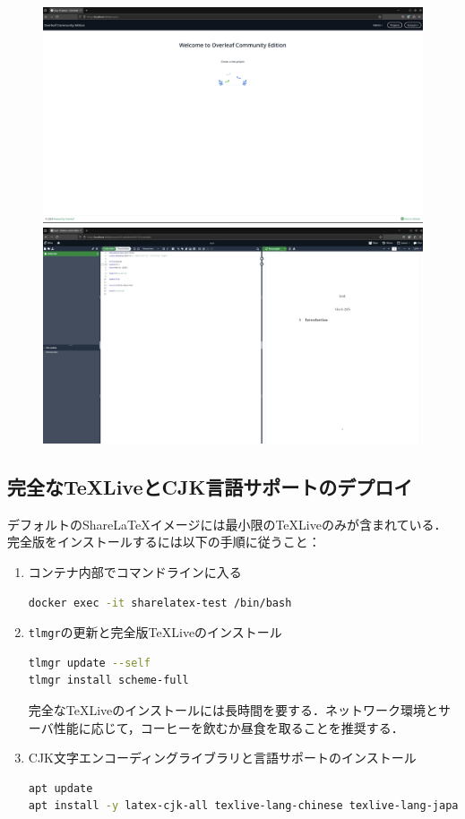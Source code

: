 \begin{figure}[H]
    \centering
    \includegraphics[width=0.8\linewidth]{images/Pasted image 20250307160922.png}
    \includegraphics[width=0.8\linewidth]{images/Pasted image 20250307161002.png}
\end{figure}

\subsection{完全なTeXLiveとCJK言語サポートのデプロイ}
デフォルトのShareLaTeXイメージには最小限のTeXLiveのみが含まれている．完全版をインストールするには以下の手順に従うこと：

\begin{enumerate}
\item コンテナ内部でコマンドラインに入る
\begin{lstlisting}[language=bash]
docker exec -it sharelatex-test /bin/bash
\end{lstlisting}

\item \texttt{tlmgr}の更新と完全版TeXLiveのインストール
\begin{lstlisting}[language=bash]
tlmgr update --self
tlmgr install scheme-full
\end{lstlisting}
完全なTeXLiveのインストールには長時間を要する．ネットワーク環境とサーバ性能に応じて，コーヒーを飲むか昼食を取ることを推奨する．

\item CJK文字エンコーディングライブラリと言語サポートのインストール
\begin{lstlisting}[language=bash]
apt update
apt install -y latex-cjk-all texlive-lang-chinese texlive-lang-japanese texlive-lang-korean texlive-lang-english fonts-noto-cjk
\end{lstlisting}
\end{enumerate}


